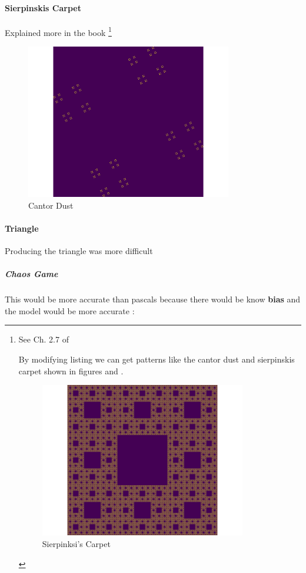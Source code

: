 \documentclass[11pt]{article}
\begin{document}
\paragraph{Sierpinskis Carpet}
\label{sec:org91fae12}

Explained more in the book \footnote{See Ch. 2.7 of \cite[Ch. 2.7]{peitgenChaosFractalsNew2004}

By modifying listing we can get patterns like the cantor dust and sierpinskis carpet shown in figures and .

\begin{figure}[htbp]
\centering
\includegraphics[width=9cm]{./media/sierpinsky_carpet.png}
\caption{\label{square-carpet}Sierpinksi's Carpet}
\end{figure}}

\begin{figure}[htbp]
\centering
\includegraphics[width=9cm]{media/Cantor_Dust_gen.png}
\caption{\label{cantor-dust}Cantor Dust}
\end{figure}

\paragraph{Triangle}
\label{sec:org702ba8a}
Producing the triangle was more difficult
\subparagraph{Chaos Game}
\label{sec:org4dd3353}
This would be more accurate than pascals because there would be know \textbf{bias} and the model would be more accurate    :
\end{document}
